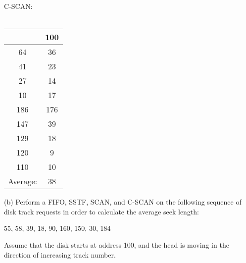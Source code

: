 \documentclass{article}
\begin{document}
\begin{minipage}[t]{0.25\textwidth}
C-SCAN:\\\\
\begin{tabular}{c|c}
& 100\\
\hline
64 & 36\\
41 & 23\\
27 & 14\\
10 & 17\\
186 & 176\\
147 & 39\\
129 & 18\\
120 & 9\\
110 & 10\\
\hline
Average: & 38
\end{tabular}
\end{minipage}

\noindent (b) Perform a FIFO, SSTF, SCAN, and C-SCAN on the following sequence of disk track requests
in order to calculate the average seek length:
\begin{center}
55, 58, 39, 18, 90, 160, 150, 30, 184
\end{center}
Assume that the disk starts at address 100, and the head is moving in the direction
of increasing track number.
\end{document}
